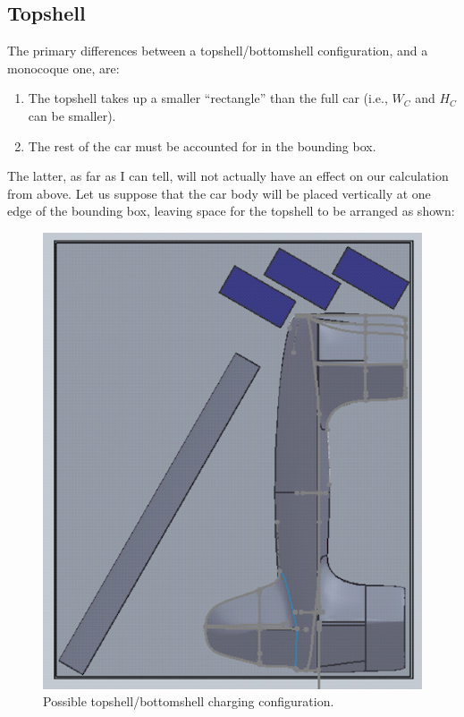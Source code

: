\documentclass[reqno, 11pt, final]{article}
\begin{document}
\subsection{Topshell}

The primary differences between a topshell/bottomshell configuration, and a monocoque one, are:
\begin{enumerate}
	\item The topshell takes up a smaller ``rectangle'' than the full car (i.e., $W_C$ and $H_C$ can be smaller).
	\item The rest of the car must be accounted for in the bounding box.
\end{enumerate}
The latter, as far as I can tell, will not actually have an effect on our calculation from above. Let us suppose that the car body will be placed vertically at one edge of the bounding box, leaving space for the topshell to be arranged as shown:

\begin{figure}[h]
	\centering \includegraphics[scale=0.5]{charging_configs_fittopshellschematic}
	\caption{Possible topshell/bottomshell charging configuration.}
\end{figure}
\end{document}
